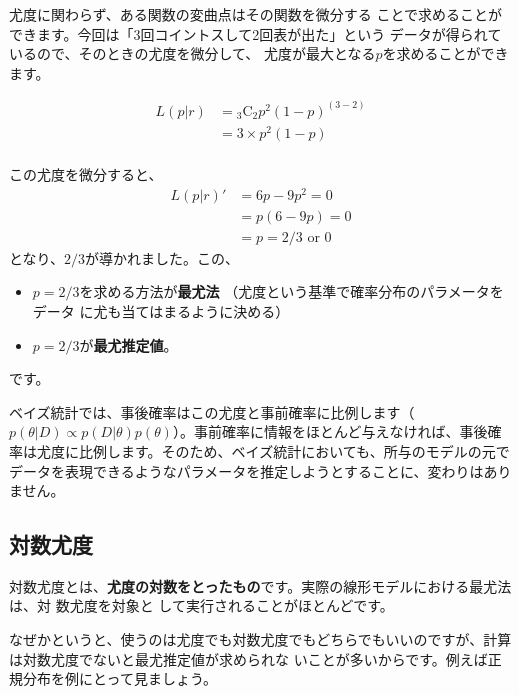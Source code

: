 尤度に関わらず、ある関数の変曲点はその関数を微分する
ことで求めることができます。今回は「3回コイントスして2回表が出た」という
データが得られているので、そのときの尤度を微分して、
尤度が最大となる$p$を求めることができます。

\begin{equation}
\begin{split}
 L(p|r) &= {_{3}\mathrm{C}_{2}} p^2(1 - p)^{(3 - 2)}\\
 &= 3 \times p^2 (1 - p) \\
\end{split}
\end{equation}

この尤度を微分すると、
\begin{equation}
\begin{split}
 L(p|r)' &= 6p - 9p^2 = 0 \\
 &= p(6 - 9p) = 0 \\
 &= p = 2/3 \text{ or } 0
\end{split}
\end{equation}
となり、$2/3$が導かれました。この、
\begin{itemize}
 \item $p = 2/3$を求める方法が\textbf{最尤法}
       （尤度という基準で確率分布のパラメータをデータ
       に尤も当てはまるように決める）
 \item $p = 2/3$が\textbf{最尤推定値}。
\end{itemize}
です。

ベイズ統計では、事後確率はこの尤度と事前確率に比例します（$p(\theta|D) \propto p(D|\theta)p(\theta)$）。事前確率に情報をほとんど与えなければ、事後確率は尤度に比例します。そのため、ベイズ統計においても、所与のモデルの元でデータを表現できるようなパラメータを推定しようとすることに、変わりはありません。

   \subsection{対数尤度}
対数尤度とは、\textbf{尤度の対数をとったもの}です。実際の線形モデルにおける最尤法は、対
数尤度を対象と
して実行されることがほとんどです。

なぜかというと、使うのは尤度でも対数尤度でもどちらでもいいのですが、計算
は対数尤度でないと最尤推定値が求められな
いことが多いからです。例えば正規分布を例にとって見ましょう。

